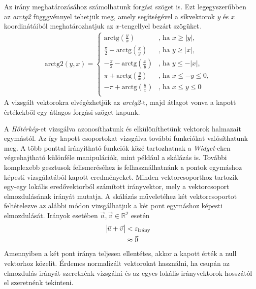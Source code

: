 Az irány meghatározásához számolhatunk forgási szöget is. Ezt legegyszerűbben az \textit{arctg2} függgvénnyel tehetjük meg, amely segítségével a síkvektorok $y$ és $x$ koordinátáiból meghatározhatjuk az $x$-tengellyel bezárt szögüket.
\begin{align*}
		\text{arctg2$(y,x)$} =
  			\begin{cases}
    			\text{arctg$\left(\frac{y}{x}\right)$} & \text{, ha $x\geq \vert y \vert$,} \\
    			\frac{\pi}{2}-\text{arctg$\left(\frac{x}{y}\right)$} & \text{, ha $y\geq \vert x \vert$,}\\
    			-\frac{\pi}{2}-\text{arctg$\left(\frac{x}{y}\right)$} & \text{, ha $y\leq -\vert x \vert$,}\\
    			\pi+\text{arctg$\left(\frac{y}{x}\right)$} & \text{, ha $x \leq -y \leq 0$,}\\
    			-\pi+\text{arctg$\left(\frac{y}{x}\right)$} & \text{, ha $x \leq y \leq 0$}\\
  			\end{cases}
\end{align*}
A vizsgált vektorokra elvégézhetjük az \textit{arctg2}-t, majd átlagot vonva a kapott értékekből egy átlagos forgási szöget kapunk.


A \textit{Hőtérkép}-et vizsgálva azonosíthatunk és elkülöníthetünk vektorok halmazait egymástól. Az így kapott csoportokat vizsgálva további funkciókat valósíthatunk meg. A több ponttal irányítható funkciók közé tartozhatnak a \textit{Widget}-eken végrehajtható különféle manipulációk, mint például a skálázás is. További komplexebb gesztusok felismeréséhez is felhasználhatnánk a pontok egymáshoz képesti vizsgálatából kapott eredményeket.
Minden vektorcsoporthoz tartozik egy-egy lokális eredővektorból számított irányvektor, mely a vektorcsoport elmozdulásának irányát mutatja.
A skálázás műveletéhez két vektorcsoportot feltételezve az alábbi módon vizsgálhatjuk a két pont egymáshoz képesti elmozdulását.
Irányok esetében $\vec{u},\vec{v}\in \mathbb{R^2}$ esetén
\begin{align*}
\vmatrix \vec{u}+\vec{v} \endvmatrix &< \varepsilon_{\text{irány}}\\
&\approx \vec{0}
\end{align*}
Amennyiben a két pont iránya teljesen ellentétes, akkor a kapott érték a null vektorhoz közelít. Érdemes normalizált vektorokat használni, ha csupán az elmozdulás irányát szeretnénk vizsgálni és az egyes lokális irányvektorok hosszától el szeretnénk tekinteni.

